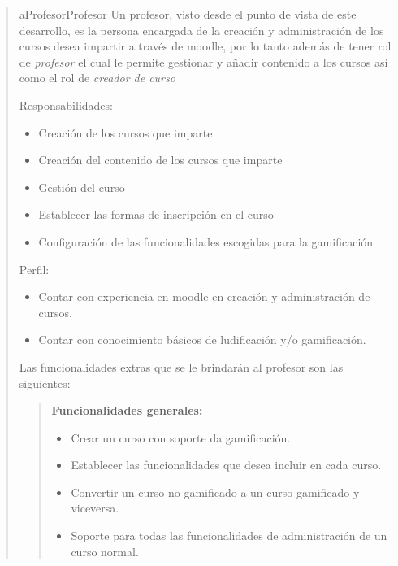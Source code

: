\begin{quote}
    \begin{actor}{aProfesor}{Profesor}{%
    Un profesor, visto desde el punto de vista de este desarrollo, es la persona
    encargada de la creación y administración de los cursos desea impartir a través
    de moodle, por lo tanto además de tener rol de {\it profesor} el cual le permite
    gestionar y añadir contenido a los cursos así como el rol de {\it creador de
    curso} \cite{MoodleRoles} \\}

    \item[Responsabilidades:] \hfill
        \begin{itemize}
        \item Creación de los cursos que imparte
        \item Creación del contenido de los cursos que imparte
        \item Gestión del curso
        \item Establecer las formas de inscripción en el curso
        \item Configuración de las funcionalidades escogidas para la gamificación
        \end{itemize}

    \item[Perfil:] \hfill
        \begin{itemize}
        \item Contar con experiencia en moodle en creación y administración de cursos.
        \item Contar con conocimiento básicos de ludificación y/o gamificación.
        \end{itemize}
    \end{actor}

    \noindent
    Las funcionalidades extras que se le brindarán al profesor son las siguientes:

    \begin{quote}
    {\bf Funcionalidades generales:}
        \begin{itemize}
        \item Crear un curso con soporte da gamificación.
        \item Establecer las funcionalidades que desea incluir en cada curso.
        \item Convertir un curso no gamificado a un curso gamificado y viceversa.
        \item Soporte para todas las funcionalidades de administración de un curso
              normal.
        \end{itemize}


\end{quote}
\end{quote}
